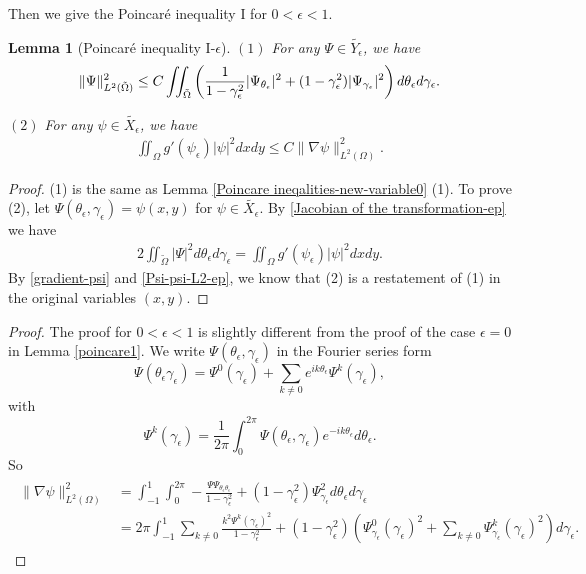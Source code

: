 \documentclass[1 [leqno, 11pt]{amsart}
\numberwithin{equation}{section}
\let\ep=\epsilon
\newtheorem{lemma}[Theorem]{Lemma}
\begin{document}
\begin{CJK*}{GBK}{song}
Then we give the Poincar\'e inequality I for $0<\epsilon<1$.

\begin{lemma}[Poincar\'e inequality I-$\ep$]\label{poincare1ep}
$(1)$ For any $\Psi \in \tilde{Y_\ep}$, we have
\begin{align*}
 \|\Psi\|_{L^2(\tilde \Omega)}^2  \leq C \iint_{\tilde \Omega}\left({1\over1-\gamma_\ep^2}|\Psi_{\theta_\ep}|^2+(1-\gamma_\ep^2)|\Psi_{\gamma_\ep}|^2\right)d \theta_\ep d\gamma_\ep.
\end{align*}

$(2)$
For any $\psi \in \tilde{X_\ep}$, we have
\begin{align}\label{Poincare inequality I-ep22}
\iint_\Omega g'(\psi_\epsilon)|\psi|^2 dxdy  \leq C \|\nabla \psi\|_{L^2(\Omega)}^2.
\end{align}
\end{lemma}
\begin{proof}
(1) is the same as Lemma \ref{Poincare ineqalities-new-variable0} (1). To prove (2), let $  \Psi(\theta_\ep, \gamma_\ep)=\psi(x,y)$ for $\psi\in\tilde{X_\ep}$. By \eqref{Jacobian of the transformation-ep} we have
\begin{align}\label{Psi-psi-L2-ep}
2\iint_{\tilde \Omega}|\Psi|^2d \theta_\ep d\gamma_\ep= \iint_\Omega g'(\psi_\epsilon)|\psi|^2 dxdy.
\end{align}
 By \eqref{gradient-psi} and \eqref{Psi-psi-L2-ep}, we know that  (2) is a restatement of  (1) in the original variables $(x,y)$.
\end{proof}
\begin{proof}
 The proof for $0 < \ep < 1$ is slightly different from the proof of the case $\ep = 0$ in Lemma \ref{poincare1}. We write $\Psi(\theta_\ep, \gamma_\ep)$ in the Fourier series form
$$\Psi(\theta_\ep \gamma_\ep) = \Psi^0(\gamma_\ep) + \sum_{k\neq 0}e^{ik\theta_\ep}\Psi^k(\gamma_\ep), $$
with $$\Psi^k(\gamma_\ep) = \frac{1}{2\pi}\int_{0}^{2\pi} \Psi(\theta_\ep,\gamma_\ep) e^{-ik\theta_\ep} d\theta_\ep.$$
So
\begin{align}\label{gradient_norm}
\begin{split}
\|\nabla \psi\|_{L^2(\Omega)}^2
& = \int_{-1}^1 \int_0 ^{2\pi} -\frac{\Psi \Psi_{\theta_\ep \theta_\ep}}{1-\gamma_\ep^2} + (1-\gamma_\ep^2)\Psi_{\gamma_\ep}^2  d\theta_\ep d\gamma_\ep \\
& = 2\pi \int_{-1}^{1} \sum_{k \neq 0} \frac{k^2 \Psi^k(\gamma_\ep)^2}{1-\gamma_\ep^2} + (1-\gamma_\ep^2) \left( \Psi^0_{\gamma_\ep}(\gamma_\ep)^2 + \sum_{k \neq 0}  \Psi^k_{\gamma_\ep}(\gamma_\ep)^2 \right) d \gamma_\ep.

\end{split}
\end{align}
\end{proof}
\end{CJK*}
\end{document}
